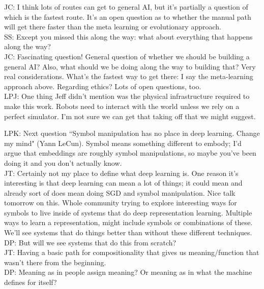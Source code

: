 JC: I think lots of routes can get to general AI, but it's partially a question of which is the fastest route. It's an open question as to whether the manual path will get there faster than the meta learning or evolutionary approach. \\

SS: Except you missed this along the way: what about everything that happens along the way? \\

JC: Fascinating question! General question of whether we should be building a general AI? Also, what should we be doing along the way to building that? Very real considerations. What's the fastest way to get there: I say the meta-learning approach above. Regarding ethics? Lots of open questions, too. \\

LPJ: One thing Jeff didn't mention was the physical infrastructure required to make this work. Robots need to interact with the world unless we rely on a perfect simulator. I'm not sure we can get that taking off that we might suggest.

\spacerule

LPK: Next question ``Symbol manipulation has no place in deep learning. Change my mind" (Yann LeCun). Symbol means something different to embody; I'd argue that embeddings are roughly symbol manipulations, so maybe you've been doing it and you don't actually know. \\

JT: Certainly not my place to define what deep learning is. One reason it's interesting is that deep learning can mean a lot of things; it could mean and already sort of does mean doing SGD and symbol manipulation. Nice talk tomorrow on this. Whole community trying to explore interesting ways for symbols to live inside of systems that do deep representation learning. Multiple ways to learn a representation, might include symbols or combinations of these. We'll see systems that do things better than without these different techniques. \\

DP: But will we see systems that do this from scratch? \\

JT: Having a basic path for compositionality that gives us meaning/function that wasn't there from the beginning. \\

DP: Meaning as in people assign meaning? Or meaning as in what the machine defines for itself? \\


